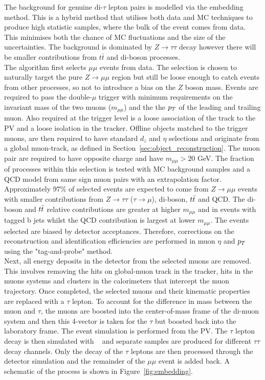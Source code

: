 The background for genuine di-$\tau$ lepton pairs is modelled via the embedding method. 
This is a hybrid method that utilises both data and MC techniques to produce high statistic samples, where the bulk of the event comes from data.
This minimises both the chance of MC fluctuations and the size of the uncertainties.
The background is dominated by $Z \rightarrow \tau \tau$ decay however there will be smaller contributions from $t\bar{t}$ and di-boson processes.  \\

The algorithm first selects $\mu\mu$ events from data.
The selection is chosen to naturally target the pure $Z \rightarrow \mu\mu$ region but still be loose enough to catch events from other processes, so not to introduce a bias on the $Z$ boson mass.
Events are required to pass the double-$\mu$ trigger with minimum requirements on the invariant mass of the two muons ($m_{\mu\mu}$) and the the $p_{T}$ of the leading and trailing muon.
Also required at the trigger level is a loose association of the track to the PV and a loose isolation in the tracker.
Offline objects matched to the trigger muons, are then required to have standard $d_z$ and $\eta$ selections and originate from a global muon-track, as defined in Section~\ref{sec:object_reconstruction}.
The muon pair are required to have opposite charge and have $m_{\mu\mu} > 20$ GeV.
The fraction of processes within this selection is tested with MC background samples and a QCD model from same sign muon pairs with an extrapolation factor.
Approximately 97\% of selected events are expected to come from $Z\rightarrow \mu\mu$ events with smaller contributions from $Z \rightarrow \tau\tau$ ($\tau\rightarrow\mu$), di-boson, $t\bar{t}$ and QCD.
The di-boson and $t\bar{t}$ relative contributions are greater at higher $m_{\mu\mu}$ and in events with tagged b jets whilst the QCD contribution is largest at lower $m_{\mu\mu}$.
The events selected are biased by detector acceptances. 
Therefore, corrections on the reconstruction and identification efficiencies are performed in muon $\eta$ and $p_{T}$ using the "tag-and-probe" method. \\

Next, all energy deposits in the detector from the selected muons are removed.
This involves removing the hits on global-muon track in the tracker, hits in the muons systems and clusters in the calorimeters that intercept the muon trajectory.
Once completed, the selected muons and their kinematic properties are replaced with a $\tau$ lepton.
To account for the difference in mass between the muon and $\tau$, the muons are boosted into the center-of-mass frame of the di-muon system and then this 4-vector is taken for the $\tau$ but boosted back into the laboratory frame.
The event simulation is performed from the PV.
The $\tau$ lepton decay is then simulated with \PYTHIA~\cite{Sirunyan:2019dfx,Sjostrand:2014zea} and separate samples are produced for different $\tau\tau$ decay channels.
Only the decay of the $\tau$ leptons are then processed through the detector simulation and the remainder of the $\mu\mu$ event is added back.
A schematic of the process is shown in Figure~\ref{fig:embedding}. \\

